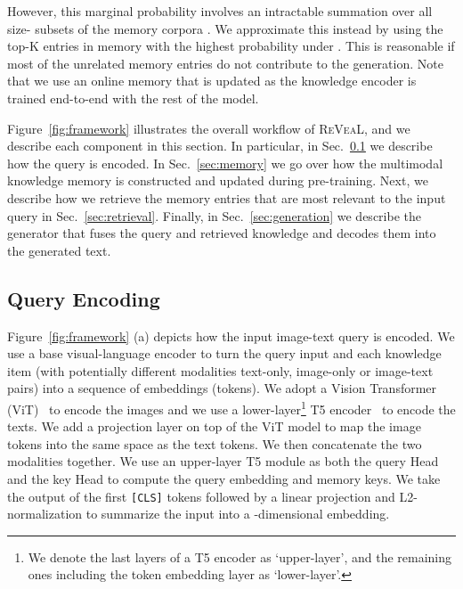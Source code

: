 \documentclass[10pt,twocolumn,letterpaper]{article}
\newcommand{\method}{R\textsc{e}V\textsc{ea}L\xspace}
\begin{document}
However, this marginal probability involves an intractable summation over all size- subsets of the memory corpora . 
We approximate this instead by using the top-K entries in memory with the highest probability under . This is reasonable if most of the unrelated memory entries do not contribute to the generation. Note that we use an online memory that is updated as the knowledge encoder is trained end-to-end with the rest of the model.  



Figure~\ref{fig:framework} illustrates the overall workflow of \method, and we describe each component in this section. In particular, in Sec.~\ref{sec:encoding} we describe how the query is encoded. In Sec.~\ref{sec:memory} we go over how the multimodal knowledge memory is constructed and updated during pre-training. Next, we describe how we retrieve the memory entries that are most relevant to the input query in Sec.~\ref{sec:retrieval}. Finally, in Sec.~\ref{sec:generation} we describe the generator that fuses the query and retrieved knowledge and decodes them into the generated text.
















   
    









\subsection{Query Encoding} \label{sec:encoding}
Figure~\ref{fig:framework} (a) depicts how the input image-text query is encoded.
We use a base visual-language encoder  to turn the query input and each knowledge item (with potentially different modalities \eg text-only, image-only or image-text pairs) into a sequence of embeddings (tokens).
We adopt a Vision Transformer (ViT)~\cite{ViT} to encode the images and we use a lower-layer\footnote{We denote the last  layers of a T5 encoder as `upper-layer', and the remaining ones including the token embedding layer as `lower-layer'.} T5 encoder~\cite{DBLP:journals/jmlr/RaffelSRLNMZLL20} to encode the texts. We add a projection layer on top of the ViT model to map the image tokens into the same space as the text tokens. We then concatenate the two modalities together.
We use an upper-layer T5 module as both the query Head  and the key Head  to compute the query embedding and memory keys. We take the output of the first \texttt{[CLS]} tokens followed by a linear projection and 
L2-normalization to summarize the input into a -dimensional embedding.
\end{document}
